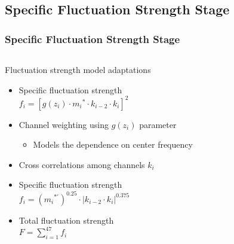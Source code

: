 \documentclass{beamer}
\newcommand{\addroughnessmodel}{%
  \resizebox{!}{7.5cm}{}
}
\newcommand{\addroughnessnode}{%
  \node[anchor=south west,inner sep=0] at (5.5mm,1mm) {
    \addroughnessmodel{}
  };
}
\begin{document}
\subsection{Specific Fluctuation Strength Stage}
\begin{frame}
  \frametitle{Specific Fluctuation Strength Stage}
  \begin{columns}
    \begin{column}[T]{0.5\textwidth}
      Fluctuation strength model adaptations
      \begin{itemize}
        \item<only@1-4> Specific fluctuation strength \\
          $f_i = [g(z_i) \cdot {m_i}^* \cdot k_{i-2} \cdot k_i]^2$
        \item<only@2-4> Channel weighting using $g(z_i)$ parameter
        \begin{itemize}
          \item<only@3-4> Models the dependence on center frequency
        \end{itemize}
        \item<only@4> Cross correlations among channels $k_i$
        \item<only@5-> Specific fluctuation strength \\
          $f_i = ({m_i}^{*\prime})^{0.25} \cdot |k_{i-2} \cdot k_i|^{0.375}$
        \item<only@7> Total fluctuation strength \\
          $F = \displaystyle\sum_{i=1}^{47} f_i$
      \end{itemize}
    \end{column}
    \begin{column}[T]{0.5\textwidth}
    \end{column}
  \end{columns}
\end{frame}
\end{document}
